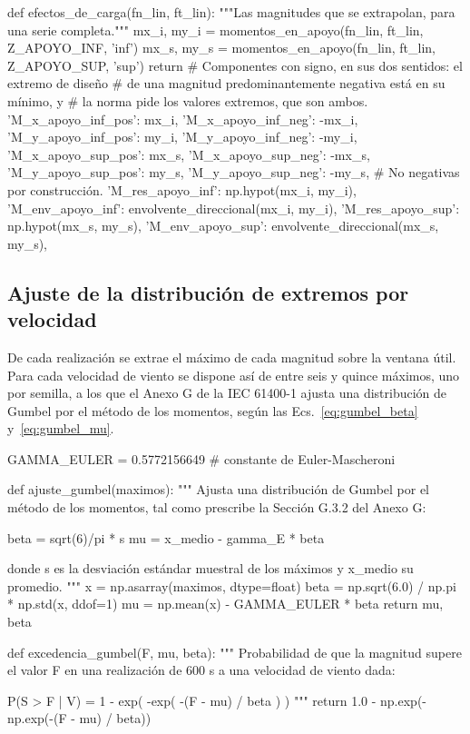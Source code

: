 \begin{pycode}
def efectos_de_carga(fn_lin, ft_lin):
    """Las magnitudes que se extrapolan, para una serie completa."""
    mx_i, my_i = momentos_en_apoyo(fn_lin, ft_lin, Z_APOYO_INF, 'inf')
    mx_s, my_s = momentos_en_apoyo(fn_lin, ft_lin, Z_APOYO_SUP, 'sup')
    return {
        # Componentes con signo, en sus dos sentidos: el extremo de diseño
        # de una magnitud predominantemente negativa está en su mínimo, y
        # la norma pide los valores extremos, que son ambos.
        'M_x_apoyo_inf_pos': mx_i, 'M_x_apoyo_inf_neg': -mx_i,
        'M_y_apoyo_inf_pos': my_i, 'M_y_apoyo_inf_neg': -my_i,
        'M_x_apoyo_sup_pos': mx_s, 'M_x_apoyo_sup_neg': -mx_s,
        'M_y_apoyo_sup_pos': my_s, 'M_y_apoyo_sup_neg': -my_s,
        # No negativas por construcción.
        'M_res_apoyo_inf': np.hypot(mx_i, my_i),
        'M_env_apoyo_inf': envolvente_direccional(mx_i, my_i),
        'M_res_apoyo_sup': np.hypot(mx_s, my_s),
        'M_env_apoyo_sup': envolvente_direccional(mx_s, my_s),
    }
\end{pycode}

\subsection*{Ajuste de la distribución de extremos por velocidad}

De cada realización se extrae el máximo de cada magnitud sobre la ventana útil. Para cada velocidad de viento se dispone así de entre seis y quince máximos, uno por semilla, a los que el Anexo G de la IEC 61400-1 ajusta una distribución de Gumbel por el método de los momentos, según las Ecs.~\ref{eq:gumbel_beta} y~\ref{eq:gumbel_mu}.

\begin{pycode}
GAMMA_EULER = 0.5772156649   # constante de Euler-Mascheroni

def ajuste_gumbel(maximos):
    """
    Ajusta una distribución de Gumbel por el método de los momentos, tal
    como prescribe la Sección G.3.2 del Anexo G:

        beta = sqrt(6)/pi * s          mu = x_medio - gamma_E * beta

    donde s es la desviación estándar muestral de los máximos y x_medio su
    promedio.
    """
    x    = np.asarray(maximos, dtype=float)
    beta = np.sqrt(6.0) / np.pi * np.std(x, ddof=1)
    mu   = np.mean(x) - GAMMA_EULER * beta
    return mu, beta


def excedencia_gumbel(F, mu, beta):
    """
    Probabilidad de que la magnitud supere el valor F en una realización
    de 600 s a una velocidad de viento dada:

        P(S > F | V) = 1 - exp( -exp( -(F - mu) / beta ) )
    """
    return 1.0 - np.exp(-np.exp(-(F - mu) / beta))
\end{pycode}

